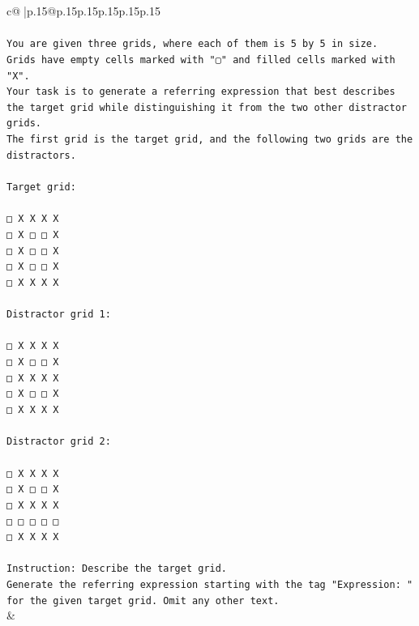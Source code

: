 \documentclass{article}
\begin{document}
{\begin{supertabular}{c@{$\;$}|p{.15\linewidth}@{}p{.15\linewidth}p{.15\linewidth}p{.15\linewidth}p{.15\linewidth}p{.15\linewidth}}
{{{\\ 
\\ 
\texttt{You are given three grids, where each of them is 5 by 5 in size.} \\
\texttt{Grids have empty cells marked with "▢" and filled cells marked with "X".} \\
\texttt{Your task is to generate a referring expression that best describes the target grid while distinguishing it from the two other distractor grids.} \\
\texttt{The first grid is the target grid, and the following two grids are the distractors.} \\
\\ 
\texttt{Target grid:} \\
\\ 
\texttt{□ X X X X} \\
\texttt{□ X □ □ X} \\
\texttt{□ X □ □ X} \\
\texttt{□ X □ □ X} \\
\texttt{□ X X X X} \\
\\ 
\texttt{Distractor grid 1:} \\
\\ 
\texttt{□ X X X X} \\
\texttt{□ X □ □ X} \\
\texttt{□ X X X X} \\
\texttt{□ X □ □ X} \\
\texttt{□ X X X X} \\
\\ 
\texttt{Distractor grid 2:} \\
\\ 
\texttt{□ X X X X} \\
\texttt{□ X □ □ X} \\
\texttt{□ X X X X} \\
\texttt{□ □ □ □ □} \\
\texttt{□ X X X X} \\
\\ 
\texttt{Instruction: Describe the target grid.} \\
\texttt{Generate the referring expression starting with the tag "Expression: " for the given target grid. Omit any other text.} \\
            }
        }
    }
    & \\ \\


\end{supertabular}}
\end{document}
